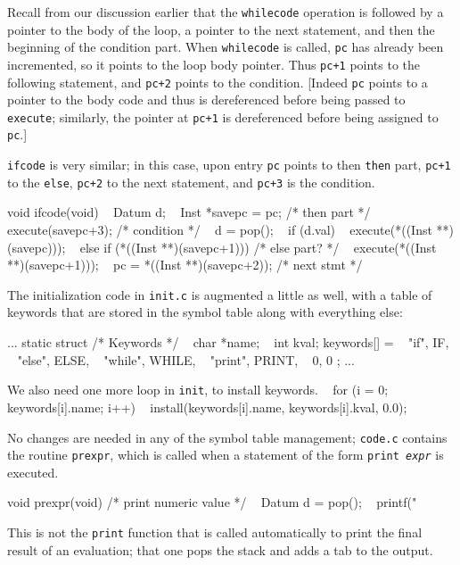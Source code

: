 \noindent
Recall from our discussion earlier that the {\tt whilecode} operation
is followed by a pointer to the body of the loop, a pointer to the
next statement, and then the beginning of the condition part.
When {\tt whilecode} is called, {\tt pc} has already been incremented,
so it points to the loop body pointer. Thus {\tt pc+1} points to the
following statement, and {\tt pc+2} points to the condition.
[Indeed {\tt pc} points to a pointer to the body code and thus
is dereferenced before being passed to {\tt execute}; similarly, the
pointer at {\tt pc+1} is dereferenced before being assigned to {\tt pc}.]

{\tt ifcode} is very similar; in this case, upon entry {\tt pc}
points to then {\tt then} part, {\tt pc+1} to the {\tt else},
{\tt pc+2} to the next statement, and {\tt pc+3} is the condition.

\begincode
void ifcode(void)
{
~       Datum d;
~       Inst *savepc = pc;     /* then part */
\smallbreak
~       execute(savepc+3);     /* condition */
~       d = pop();
~       if (d.val)
~               execute(*((Inst **)(savepc)));
~       else if (*((Inst **)(savepc+1)))  /* else part? */
~               execute(*((Inst **)(savepc+1)));
~       pc = *((Inst **)(savepc+2));      /* next stmt */
}
\endcode

The initialization code in {\tt init.c} is augmented a little as well,
with a table of keywords that are stored in the symbol table along
with everything else:

\begincode
...
static struct {  /* Keywords */
~       char *name;
~       int   kval;
} keywords[] = {
~       "if",      IF,
~       "else",    ELSE,
~       "while",   WHILE,
~       "print",   PRINT,
~       0,         0
};
...
\endcode

\noindent
We also need one more loop in {\tt init}, to install keywords.
\begincode
~  for (i = 0; keywords[i].name; i++)
~          install(keywords[i].name, keywords[i].kval, 0.0);
\endcode

No changes are needed in any of the symbol table management;
{\tt code.c} contains the routine {\tt prexpr}, which is called
when a statement of the form {\tt print~\it expr\/} is executed.

\begincode
void prexpr(void)  /* print numeric value */
{
~       Datum d = pop();
~       printf("%
}
\endcode

\noindent
This is not the {\tt print} function that is called automatically
to print the final result of an evaluation; that one pops the
stack and adds a tab to the output.

